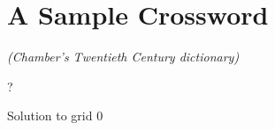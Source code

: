 \documentclass{article}
\begin{document}
    \section*{A Sample Crossword}
    \textit{(Chamber's Twentieth Century dictionary)}
    \begin{crossword}{15}{?}
      
    \end{crossword}
    \begin{crossword*}{15}{Solution to grid 0}
      
    \end{crossword*}
\end{document}

